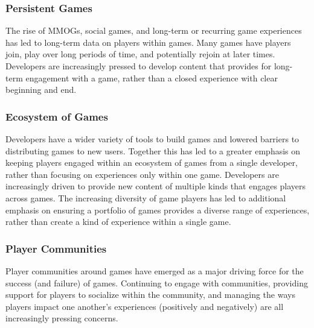 \documentclass[conference]{IEEEtran}
\begin{document}
\subsubsection{Persistent Games} 
The rise of MMOGs, social games, and long-term or recurring game experiences has led to long-term data on players within games. Many games have players join, play over long periods of time, and potentially rejoin at later times. Developers are increasingly pressed to develop content that provides for long-term engagement with a game, rather than a closed experience with clear beginning and end.

\subsubsection{Ecosystem of Games}
Developers have a wider variety of tools to build games and lowered barriers to distributing games to new users. Together this has led to a greater emphasis on keeping players engaged within an ecosystem of games from a single developer, rather than focusing on experiences only within one game. Developers are increasingly driven to provide new content of multiple kinds that engages players across games. The increasing diversity of game players has led to additional emphasis on ensuring a portfolio of games provides a diverse range of experiences, rather than create a kind of experience within a single game.

\subsubsection{Player Communities}
Player communities around games have emerged as a major driving force for the success (and failure) of games. Continuing to engage with communities, providing support for players to socialize within the community, and managing the ways players impact one another's experiences (positively and negatively) are all increasingly pressing concerns.

\end{document}
